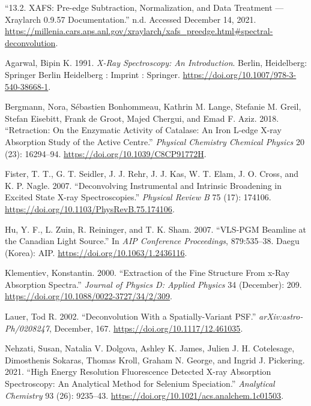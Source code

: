 \documentclass[
]{article}
\newlength{\cslhangindent}
\newlength{\cslentryspacingunit} %
\newenvironment{CSLReferences}[2] %
 {%
  \setlength{\parindent}{0pt}
  \ifodd #1
  \let\oldpar\par
  \def\par{\hangindent=\cslhangindent\oldpar}
  \fi
  \setlength{\parskip}{#2\cslentryspacingunit}
 }%
 {}
\begin{document}
\hypertarget{refs}{}
\begin{CSLReferences}{1}{0}
\leavevmode{}%
{``13.2. {XAFS}: {Pre-edge Subtraction}, {Normalization}, and Data
Treatment --- Xraylarch 0.9.57 Documentation.''} n.d. Accessed December
14, 2021.
\url{https://millenia.cars.aps.anl.gov/xraylarch/xafs_preedge.html\#spectral-deconvolution}.

\leavevmode{}%
Agarwal, Bipin K. 1991. \emph{X-{Ray Spectroscopy}: An {Introduction}}.
{Berlin, Heidelberg}: {Springer Berlin Heidelberg : Imprint : Springer}.
\url{https://doi.org/10.1007/978-3-540-38668-1}.

\leavevmode{}%
Bergmann, Nora, Sébastien Bonhommeau, Kathrin M. Lange, Stefanie M.
Greil, Stefan Eisebitt, Frank de Groot, Majed Chergui, and Emad F. Aziz.
2018. {``Retraction: {On} the Enzymatic Activity of Catalase: An Iron
{L-edge X-ray} Absorption Study of the Active Centre.''} \emph{Physical
Chemistry Chemical Physics} 20 (23): 16294--94.
\url{https://doi.org/10.1039/C8CP91772H}.

\leavevmode{}%
Fister, T. T., G. T. Seidler, J. J. Rehr, J. J. Kas, W. T. Elam, J. O.
Cross, and K. P. Nagle. 2007. {``Deconvolving {Instrumental} and
{Intrinsic Broadening} in {Excited State X-ray Spectroscopies}.''}
\emph{Physical Review B} 75 (17): 174106.
\url{https://doi.org/10.1103/PhysRevB.75.174106}.

\leavevmode{}%
Hu, Y. F., L. Zuin, R. Reininger, and T. K. Sham. 2007. {``{VLS-PGM
Beamline} at the {Canadian Light Source}.''} In \emph{{AIP Conference
Proceedings}}, 879:535--38. {Daegu (Korea)}: {AIP}.
\url{https://doi.org/10.1063/1.2436116}.

\leavevmode{}%
Klementiev, Konstantin. 2000. {``Extraction of the {Fine Structure From}
x-Ray {Absorption Spectra}.''} \emph{Journal of Physics D: Applied
Physics} 34 (December): 209.
\url{https://doi.org/10.1088/0022-3727/34/2/309}.

\leavevmode{}%
Lauer, Tod R. 2002. {``Deconvolution {With} a {Spatially-Variant
PSF}.''} \emph{arXiv:astro-Ph/0208247}, December, 167.
\url{https://doi.org/10.1117/12.461035}.

\leavevmode{}%
Nehzati, Susan, Natalia V. Dolgova, Ashley K. James, Julien J. H.
Cotelesage, Dimosthenis Sokaras, Thomas Kroll, Graham N. George, and
Ingrid J. Pickering. 2021. {``High {Energy Resolution Fluorescence
Detected X-ray Absorption Spectroscopy}: {An Analytical Method} for
{Selenium Speciation}.''} \emph{Analytical Chemistry} 93 (26): 9235--43.
\url{https://doi.org/10.1021/acs.analchem.1c01503}.


\end{CSLReferences}
\end{document}

